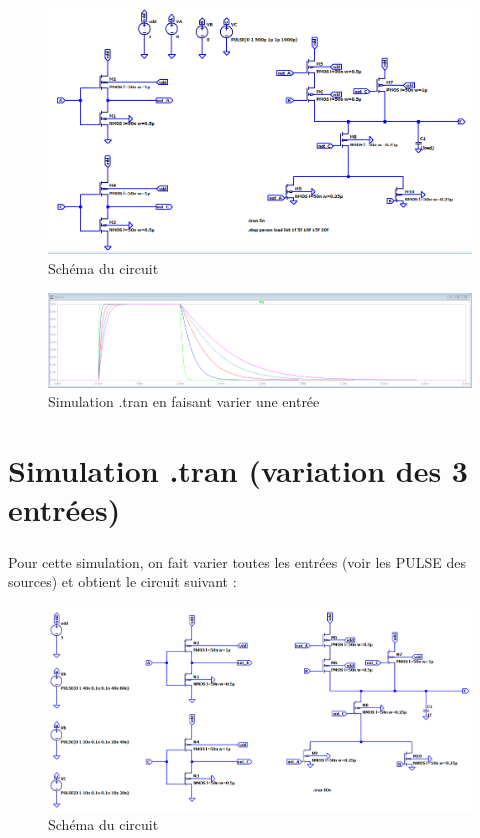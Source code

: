         \begin{figure}[H]
            \centering
            \includegraphics[scale=0.5]{../pictures/stepC.png}
            \caption{Schéma du circuit}
        \end{figure}
        

        \begin{figure}[H]
            \centering
            \includegraphics[scale=0.35]{../pictures/step.png}
            \caption{Simulation .tran en faisant varier une entrée}
        \end{figure}
        
\section{Simulation .tran (variation des 3 entrées)}

        \subparagraph{}Pour cette simulation, on fait varier toutes les entrées (voir les PULSE des sources) et obtient le circuit suivant : 

    
        \begin{figure}[H]
            \centering
            \includegraphics[scale=0.4]{../pictures/tranC.png}
            \caption{Schéma du circuit}
        \end{figure}

